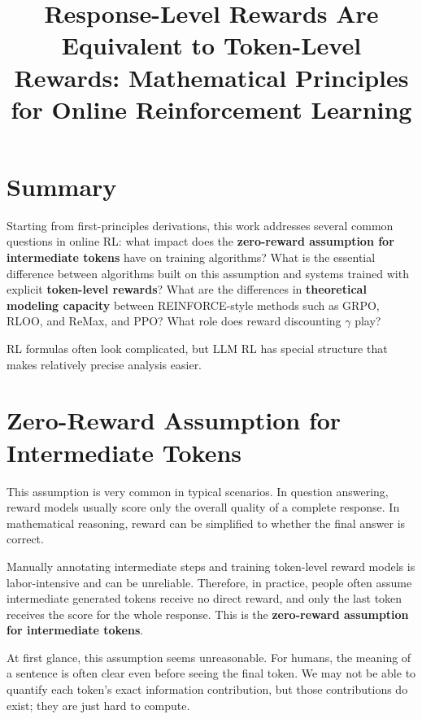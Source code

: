 \documentclass[11pt,english]{ctexart}
\begin{document}
\title{Response-Level Rewards Are Equivalent to Token-Level Rewards: Mathematical Principles for Online Reinforcement Learning}

\maketitle

\section{Summary}

Starting from first-principles derivations, this work addresses several common questions in online RL: what impact does the \textbf{zero-reward assumption for intermediate tokens} have on training algorithms? What is the essential difference between algorithms built on this assumption and systems trained with explicit \textbf{token-level rewards}? What are the differences in \textbf{theoretical modeling capacity} between REINFORCE-style methods such as GRPO, RLOO, and ReMax, and PPO? What role does reward discounting $\gamma$ play?

RL formulas often look complicated, but LLM RL has special structure that makes relatively precise analysis easier.

\section{\textbf{Zero-Reward Assumption for Intermediate Tokens}}

This assumption is very common in typical scenarios. In question answering, reward models usually score only the overall quality of a complete response. In mathematical reasoning, reward can be simplified to whether the final answer is correct.

Manually annotating intermediate steps and training token-level reward models is labor-intensive and can be unreliable. Therefore, in practice, people often assume intermediate generated tokens receive no direct reward, and only the last token receives the score for the whole response. This is the \textbf{zero-reward assumption for intermediate tokens}.

At first glance, this assumption seems unreasonable. For humans, the meaning of a sentence is often clear even before seeing the final token. We may not be able to quantify each token's exact information contribution, but those contributions do exist; they are just hard to compute.
\end{document}
